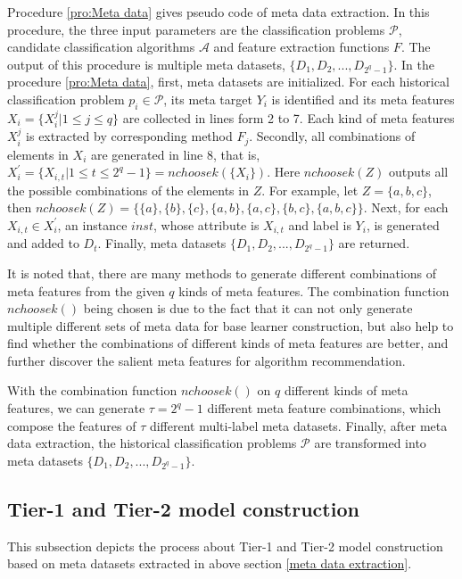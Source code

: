 \documentclass[review,3p,twocolumn,times]{elsarticle}
\begin{document}
Procedure \ref{pro:Meta data} gives pseudo code of meta data extraction. In this procedure, the three input parameters are the classification problems $\mathcal{P}$, candidate classification algorithms $\mathcal{A}$ and feature extraction functions $F$. The output of this procedure is multiple meta datasets, $\{D_1,D_2, ..., D_{2^q-1}\}$. In the procedure \ref{pro:Meta data}, first, meta datasets are initialized. For each historical classification problem $p_i \in \mathcal{P}$, its meta target $Y_i$ is identified and its meta features $X_i=\{X_i^j | 1 \leq j \leq q\}$ are collected in lines form 2 to 7. Each kind of meta features $X_i^j$ is extracted by corresponding method $F_j$. Secondly, all combinations of elements in $X_i$ are generated in line 8, that is, $X_i^{'} = \{X_{i,t} | 1 \leq t \leq 2^q - 1\} = nchoosek(\{X_i\})$. Here $nchoosek(Z)$ outputs all the possible combinations of the elements in $Z$. For example, let $Z=\{a, b, c\}$, then $nchoosek(Z)=\{\{a\}, \{b\}, \{c\}, \{a, b\}, \{a, c\}, \{b, c\}, \{a, b, c\}\}$. Next, for each $X_{i,t} \in X_i^{'}$, an instance $inst$, whose attribute is $X_{i,t}$ and label is $Y_i$, is generated and added to $D_t$. Finally, meta datasets $\{D_1,D_2, ..., D_{2^q-1}\}$ are returned. 

It is noted that, there are many methods to generate different combinations of meta features from the given $q$ kinds of meta features. The combination function $nchoosek()$ being chosen is due to the fact that it can not only generate multiple different sets of meta data for base learner construction, but also help to find whether the combinations of different kinds of meta features are better, and further discover the salient meta features for algorithm recommendation.

With the combination function $nchoosek()$ on $q$ different kinds of meta features, we can generate $\tau = 2^q - 1$ different meta feature combinations, which compose the features of $\tau$ different multi-label meta datasets. Finally, after meta data extraction, the historical classification problems $\mathcal{P}$ are transformed into meta datasets $\{D_1,D_2, ..., D_{2^q-1}\}$.


\subsection{Tier-1 and Tier-2 model construction}

This subsection depicts the process about Tier-1 and Tier-2 model construction based on meta datasets extracted in above section \ref{meta data extraction}. 
\end{document}
